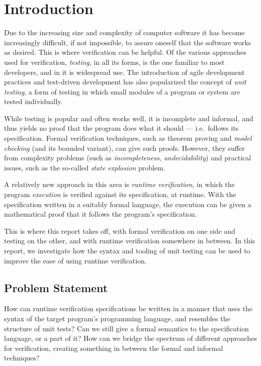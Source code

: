 
\pagestyle{newchap}
\chapter{Introduction} \label{chapter-introduction}

Due to the increasing size and complexity of computer software it has become
increasingly difficult, if not impossible, to assure oneself that the software
works as desired. This is where verification can be helpful. Of the various
approaches used for verification, \textit{testing}, in all its forms, is the
one familiar to most developers, and in it is widespread use. The introduction
of agile development practices and test-driven development has also popularized
the concept of \textit{unit testing}, a form of testing in which small modules
of a program or system are tested individually.

While testing is popular and often works well, it is incomplete and informal,
and thus yields no proof that the program does what it should --- i.e.\ follows
its specification. Formal verification techniques, such as theorem proving and
\textit{model checking} (and its bounded variant), can give such proofs.
However, they suffer from complexity problems (such as \textit{incompleteness},
\textit{undecidability}) and practical issues, such as the so-called
\textit{state explosion} problem.

A relatively new approach in this area is \textit{runtime verification}, in
which the program \textit{execution} is verified against its specification, at
runtime. With the specification written in a suitably formal language, the
execution can be given a mathematical proof that it follows the program's
specification.

This is where this report takes off, with formal verification on one side and
testing on the other, and with runtime verification somewhere in between. In
this report, we investigate how the syntax and tooling of unit testing can be
used to improve the ease of using runtime verification.


\section{Problem Statement} \label{section-problem-statement}

How can runtime verification specifications be written in a manner that uses
the syntax of the target program's programming language, and resembles the
structure of unit tests? Can we still give a formal semantics to the
specification language, or a part of it? How can we bridge the spectrum of
different approaches for verification, creating something in between the formal
and informal techniques?


